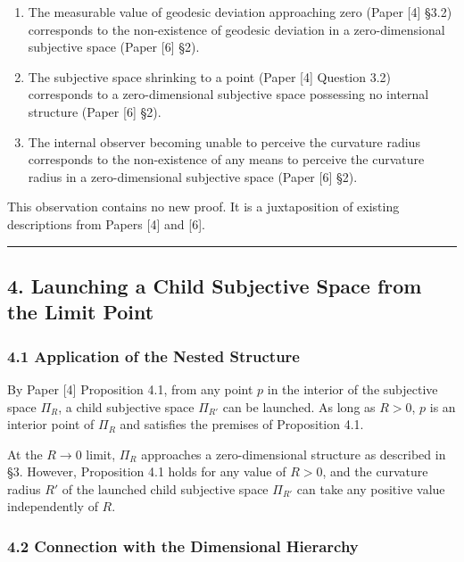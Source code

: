 \documentclass[a4paper,11pt]{article}
\theoremstyle{definition}
\providecommand{\tightlist}{\setlength{\itemsep}{0pt}\setlength{\parskip}{0pt}}
\begin{document}
\begin{enumerate}
\def\labelenumi{\arabic{enumi}.}
\tightlist
\item
  The measurable value of geodesic deviation approaching zero (Paper
  {[}4{]} §3.2) corresponds to the non-existence of geodesic deviation
  in a zero-dimensional subjective space (Paper {[}6{]} §2).
\item
  The subjective space shrinking to a point (Paper {[}4{]} Question 3.2)
  corresponds to a zero-dimensional subjective space possessing no
  internal structure (Paper {[}6{]} §2).
\item
  The internal observer becoming unable to perceive the curvature radius
  corresponds to the non-existence of any means to perceive the
  curvature radius in a zero-dimensional subjective space (Paper {[}6{]}
  §2).
\end{enumerate}

This observation contains no new proof. It is a juxtaposition of
existing descriptions from Papers {[}4{]} and {[}6{]}.

\begin{center}\rule{0.5\linewidth}{0.5pt}\end{center}

\subsection{4. Launching a Child Subjective Space from the Limit
Point}\label{launching-a-child-subjective-space-from-the-limit-point}

\subsubsection{4.1 Application of the Nested
Structure}\label{application-of-the-nested-structure}

By Paper {[}4{]} Proposition 4.1, from any point \(p\) in the interior
of the subjective space \(\Pi_R\), a child subjective space \(\Pi_{R'}\)
can be launched. As long as \(R > 0\), \(p\) is an interior point of
\(\Pi_R\) and satisfies the premises of Proposition 4.1.

At the \(R \to 0\) limit, \(\Pi_R\) approaches a zero-dimensional
structure as described in §3. However, Proposition 4.1 holds for any
value of \(R > 0\), and the curvature radius \(R'\) of the launched
child subjective space \(\Pi_{R'}\) can take any positive value
independently of \(R\).

\subsubsection{4.2 Connection with the Dimensional
Hierarchy}\label{connection-with-the-dimensional-hierarchy}
\end{document}
